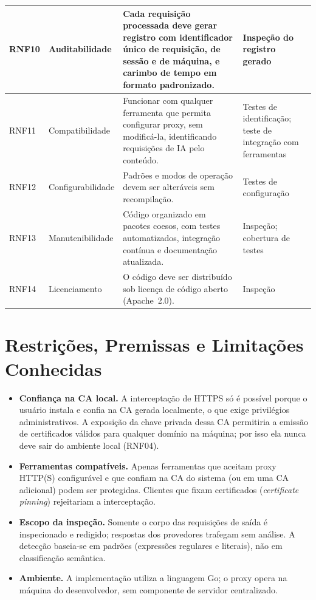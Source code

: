 {\begin{longtable}{|p{1.35cm}|p{2.3cm}|p{6.1cm}|p{3.4cm}|}
RNF10 & Auditabilidade & Cada requisição processada deve gerar registro com identificador único de requisição, de sessão e de máquina, e carimbo de tempo em formato padronizado. & Inspeção do registro gerado \\ \hline
RNF11 & Compatibilidade & Funcionar com qualquer ferramenta que permita configurar proxy, sem modificá-la, identificando requisições de IA pelo conteúdo. & Testes de identificação; teste de integração com ferramentas \\ \hline
RNF12 & Configurabilidade & Padrões e modos de operação devem ser alteráveis sem recompilação. & Testes de configuração \\ \hline
RNF13 & Manutenibilidade & Código organizado em pacotes coesos, com testes automatizados, integração contínua e documentação atualizada. & Inspeção; cobertura de testes \\ \hline
RNF14 & Licenciamento & O código deve ser distribuído sob licença de código aberto (Apache~2.0). & Inspeção \\ \hline
\end{longtable}
}
\noindent{}

\section{Restrições, Premissas e Limitações Conhecidas}

\begin{itemize}
    \item \textbf{Confiança na CA local.} A interceptação de HTTPS só é possível porque o usuário instala e confia na CA gerada localmente, o que exige privilégios administrativos. A exposição da chave privada dessa CA permitiria a emissão de certificados válidos para qualquer domínio na máquina; por isso ela nunca deve sair do ambiente local (RNF04).
    \item \textbf{Ferramentas compatíveis.} Apenas ferramentas que aceitam proxy HTTP(S) configurável e que confiam na CA do sistema (ou em uma CA adicional) podem ser protegidas. Clientes que fixam certificados (\textit{certificate pinning}) rejeitariam a interceptação.
    \item \textbf{Escopo da inspeção.} Somente o corpo das requisições de saída é inspecionado e redigido; respostas dos provedores trafegam sem análise. A detecção baseia-se em padrões (expressões regulares e literais), não em classificação semântica.
    \item \textbf{Ambiente.} A implementação utiliza a linguagem Go; o proxy opera na máquina do desenvolvedor, sem componente de servidor centralizado.
\end{itemize}

